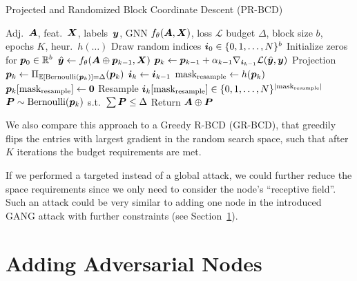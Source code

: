 \documentclass[sigconf,authordraft]{acmart}
\newcommand{\adj}{\mA}
\newcommand{\features}{\mX}
\begin{document}
\begin{algorithm}[h]
  \small
  \caption{Projected and Randomized Block Coordinate Descent (PR-BCD)}
  \label{algo:prbcd}
  \begin{algorithmic}[1]
     Adj.\ \(\adj\), feat.\ \(\features\), labels\ \({\bm{y}}\), GNN \(f_{\theta}(\adj, \features)\), loss \(\mathcal{L}\)
     budget \(\Delta\), block size \(b\), epochs \(K\), heur.\ \(h(\dots)\)
    \STATE Draw random indices \({\bm{i}}_0 \in \{0, 1, \dots, N\}^b\)
    \STATE Initialize zeros for \({\bm{p}}_0 \in \mathbb{R}^b\)
    \STATE \(\hat{\vy} \leftarrow f_{\theta}(\adj \oplus \vp_{k-1}, \features)\)
    \STATE \({\bm{p}}_{k} \leftarrow {\bm{p}}_{k-1} + \alpha_{k-1} \nabla_{{\bm{i}}_{k-1}} \mathcal{L}(\hat{{\bm{y}}}, {\bm{y}})\)
    \STATE Projection \({\bm{p}}_{k} \leftarrow \Pi_{\mathbb{E}[\text{Bernoulli}({\bm{p}}_k)] = \Delta} ({\bm{p}}_{k})\)
    \STATE \({\bm{i}}_{k} \leftarrow {\bm{i}}_{k-1}\)
    \STATE \(\text{mask}_{\text{resample}} \leftarrow h({\bm{p}}_{k})\)
    \STATE \({\bm{p}}_k[\text{mask}_{\text{resample}}] \leftarrow \mathbf{0}\)
    \STATE Resample \({\bm{i}}_{k}[\text{mask}_{\text{resample}}] \in \{0, 1, \dots, N\}^{|\text{mask}_{\text{resample}}|}\)
    \ENDIF
    \ENDFOR
    \STATE \({\bm{P}} \sim \text{Bernoulli}({\bm{p}}_{k})\) s.t.\ \(\sum {\bm{P}} \le \Delta\)
    \STATE Return \(\adj \oplus \mP\)
  \end{algorithmic}
\end{algorithm}

We also compare this approach to a Greedy R-BCD (GR-BCD), that greedily flips the entries with largest gradient in the random search space, such that after \(K\) iterations the budget requirements are met.

If we performed a targeted instead of a global attack, we could further reduce the space requirements since we only need to consider the node's ``receptive field''. Such an attack could be very similar to adding one node in the introduced GANG attack with further constraints (see Section~\ref{sec:attackkdd}).

\section{Adding Adversarial Nodes}\label{sec:attackkdd}
\end{document}

